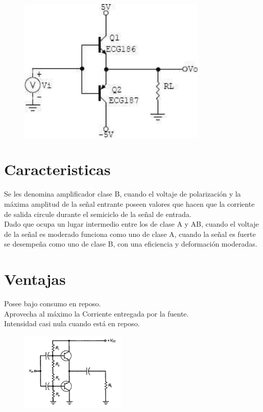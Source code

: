 \documentclass[12pt,a4paper]{article}
\begin{document}
\begin{figure}[h!]
\centering
\includegraphics[width=9cm]{AmplificadorClaseB.jpg} 
\end{figure}

\section{Caracteristicas}
Se les denomina amplificador clase B, cuando el voltaje de polarización y la máxima amplitud de la señal entrante poseen valores que hacen que la corriente de salida circule durante el semiciclo de la señal de entrada.\\Dado que ocupa un lugar intermedio entre los de clase A y AB, cuando el voltaje de la señal es moderado funciona como uno de clase A, cuando la señal es fuerte se desempeña como uno de clase B, con una eficiencia y deformación moderadas.

\section{Ventajas}
Posee bajo consumo en reposo.\\Aprovecha al máximo la Corriente entregada por la fuente.
\\Intensidad casi nula cuando está en reposo.

\begin{figure}
\centering
\includegraphics[width=5cm]{AmplificadorClaseB2.png} 
\end{figure}
\end{document}
